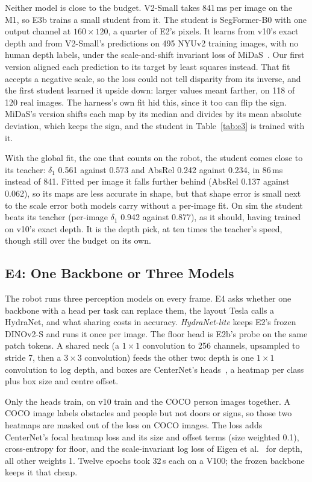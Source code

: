 \documentclass[conference]{IEEEtran}
\begin{document}
Neither model is close to the budget. V2-Small takes 841\,ms per image on the
M1, so E3b trains a small student from it. The student is SegFormer-B0 with
one output channel at $160\times120$, a quarter of E2's pixels. It learns
from v10's exact depth and from V2-Small's predictions on 495 NYUv2 training
images, with no human depth labels, under the scale-and-shift invariant loss
of MiDaS~\cite{ranftl2022midas}. Our first version aligned each prediction to
its target by least squares instead. That fit accepts a
negative scale, so the loss could not tell disparity from its inverse, and
the first student learned it upside down: larger values meant farther, on 118
of 120 real images. The harness's own fit hid this, since it too can flip
the sign. MiDaS's version shifts each map by its median and divides by its
mean absolute deviation, which keeps the sign, and the student in
Table~\ref{tab:e3} is trained with it.

With the global fit, the one that counts on the robot, the student comes
close to its teacher: $\delta_1$ 0.561 against 0.573 and AbsRel 0.242
against 0.234, in 86\,ms instead of 841. Fitted per image it falls further
behind (AbsRel 0.137 against 0.062), so its maps are less accurate in shape,
but that shape error is small next to the scale error both models carry
without a per-image fit. On sim the student beats its teacher (per-image
$\delta_1$ 0.942 against 0.877), as it should, having trained on v10's
exact depth. It is the depth pick, at ten times the teacher's speed, though
still over the budget on its own.

\subsection{E4: One Backbone or Three Models}
\label{sec:e4}

The robot runs three perception models on every frame. E4 asks whether one
backbone with a head per task can replace them, the layout Tesla calls a
HydraNet, and what sharing costs in accuracy. \emph{HydraNet-lite} keeps E2's
frozen DINOv2-S and runs it once per image. The floor head is E2b's probe on
the same patch tokens. A shared neck (a $1\times1$ convolution to 256
channels, upsampled to stride 7, then a $3\times3$ convolution) feeds the
other two: depth is one $1\times1$ convolution to log depth, and boxes are
CenterNet's heads~\cite{zhou2019objects}, a heatmap per class plus box size
and centre offset.

Only the heads train, on v10 train and the COCO person images together. A
COCO image labels obstacles and people but not doors or signs, so those two
heatmaps are masked out of the loss on COCO images. The loss adds CenterNet's
focal heatmap loss and its size and offset terms (size weighted 0.1),
cross-entropy for floor, and the scale-invariant log loss of Eigen et
al.~\cite{eigen2014depth} for depth, all other weights 1. Twelve epochs took
32\,s each on a V100; the frozen backbone keeps it that cheap.
\end{document}
